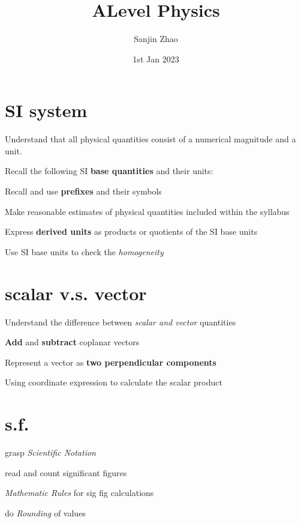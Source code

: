 \documentclass[a4paper]{tufte-handout}
\title{ALevel Physics}
\author{Sanjin Zhao}
\date{1st Jan 2023}  %
\begin{document}
\maketitle%


\section{SI system}
\begin{todolist}
  \item Understand that all physical quantities consist of a numerical magnitude and a unit.
  \item Recall the following SI \textbf{base quantities} and their units:
  \item Recall and use \textbf{prefixes} and their symbols
  \item Make reasonable estimates of physical quantities included within the syllabus
  \item Express \textbf{derived units} as products or quotients of the SI base units
  \item Use SI base units to check the \emph{homogeneity}
\end{todolist}
\clearpage

\section{scalar v.s. vector}
\begin{todolist}
  \item Understand the difference between \emph{scalar and vector} quantities
  \item \textbf{Add} and \textbf{subtract} coplanar vectors
  \item Represent a vector as \textbf{two perpendicular components}
  \item Using coordinate expression to calculate the scalar product
\end{todolist}
\clearpage

\section{s.f.}
\begin{todolist}
  \item grasp \emph{Scientific Notation}
  \item read and count significant figures
  \item \emph{Mathematic Rules} for sig fig calculations
  \item do \emph{Rounding} of values
\end{todolist}
\clearpage
\end{document}
